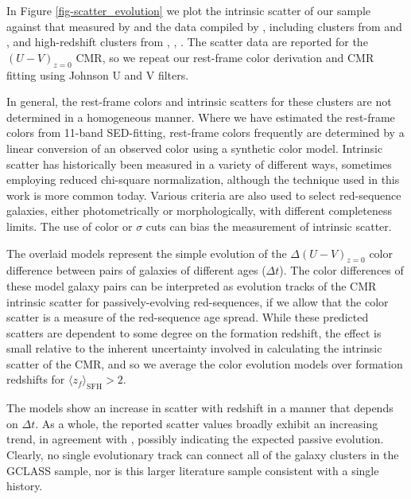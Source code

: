 In Figure \ref{fig-scatter_evolution} we plot the intrinsic scatter of our sample against that measured by \citet{Snyder:2012wq} and the data compiled by \citet{Hilton:2009nq}, including clusters from \citet{Mei:2006ec} and \citet{Blakeslee:2003qq}, and high-redshift clusters from \citet{Papovich:2010yj}, \citet{Stanford:2012yi}, \citet{Zeimann:2012bf}. The scatter data are reported for the $(U-V)_{z=0}$ CMR, so we repeat our rest-frame color derivation and CMR fitting using Johnson U and V filters.

In general, the rest-frame colors and intrinsic scatters for these clusters are not determined in a homogeneous manner. Where we have estimated the rest-frame colors from 11-band SED-fitting, rest-frame colors frequently are determined by a linear conversion of an observed color using a synthetic color model. Intrinsic scatter has historically been measured in a variety of different ways, sometimes employing reduced chi-square normalization, although the technique used in this work is more common today. Various criteria are also used to select red-sequence galaxies, either photometrically or morphologically, with different completeness limits. The use of color or $\sigma$ cuts can bias the measurement of intrinsic scatter.

The overlaid models represent the simple evolution of the $\Delta (U-V)_{z=0}$ color difference between pairs of galaxies of different ages ($\Delta t$). The color differences of these model galaxy pairs can be interpreted as evolution tracks of the CMR intrinsic scatter for passively-evolving red-sequences, if we allow that the color scatter is a measure of the red-sequence age spread. While these predicted scatters are dependent to some degree on the formation redshift, the effect is small relative to the inherent uncertainty involved in calculating the intrinsic scatter of the CMR, and so we average the color evolution models over formation redshifts for $\langle z_f \rangle_\mathrm{SFH} > 2$.

The models show an increase in scatter with redshift in a manner that depends on $\Delta t$. As a whole, the reported scatter values broadly exhibit an increasing trend, in agreement with \citet{Hilton:2009nq}, possibly indicating the expected passive evolution. Clearly, no single evolutionary track can connect all of the galaxy clusters in the GCLASS sample, nor is this larger literature sample consistent with a single history. %


